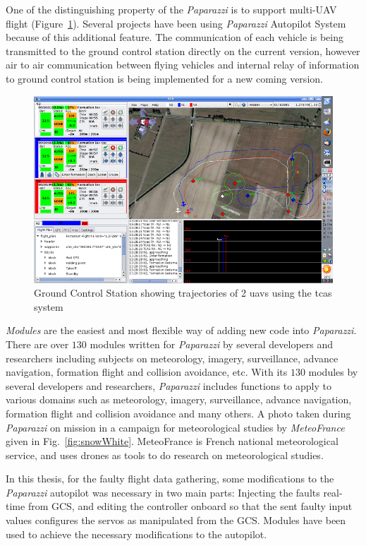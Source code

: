 One of the distinguishing property of the \emph{Paparazzi} is to support multi-UAV flight (Figure~\ref{fig:pic2}). Several projects have been using \emph{Paparazzi} Autopilot System because of this additional feature. The communication of each vehicle is being transmitted to the ground control station directly on the current version, however air to air communication between flying vehicles and internal relay of information to ground control station is being implemented for a new coming version.

\begin{figure}
	\centering
	\includegraphics[width=1\textwidth]{figures/pic2}
	\caption{Ground Control Station showing trajectories of 2 \gls{uav}s using the \gls{tcas} system}
	\label{fig:pic2}
\end{figure}

\emph{Modules} are the easiest and most flexible way of adding new code into \emph{Paparazzi}. 
There are over $130$ modules written for \emph{Paparazzi} by several developers and researchers including subjects on meteorology, imagery, surveillance, advance navigation, formation flight and collision avoidance, etc. 
With its $130$ modules by several developers and researchers, \emph{Paparazzi} includes functions to apply to various domains such as meteorology, imagery, surveillance, advance navigation, formation flight and collision avoidance and many others. 
A photo taken during \emph{Paparazzi} on mission in a campaign for meteorological studies by \emph{MeteoFrance} given in Fig.~\ref{fig:snowWhite}. MeteoFrance is French national meteorological service, and uses drones as tools to do research on meteorological studies.

In this thesis, for the faulty flight data gathering, some modifications to the \emph{Paparazzi} autopilot was necessary in two main parts: Injecting the faults real-time from GCS, and editing the controller onboard so that the sent faulty input values configures the servos as manipulated from the GCS. 
Modules have been used to achieve the necessary modifications to the autopilot.


